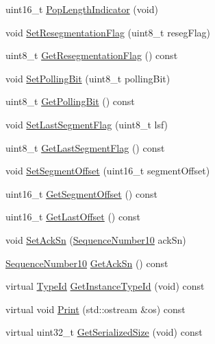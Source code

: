 \begin{DoxyCompactItemize}
\item 
uint16\+\_\+t \hyperlink{classns3_1_1LteRlcAmHeader_aada74283d61785bdae7b6b33bd4a1c63}{Pop\+Length\+Indicator} (void)
\item 
void \hyperlink{classns3_1_1LteRlcAmHeader_ad86717164e73bb1e28c3bafb24bb40de}{Set\+Resegmentation\+Flag} (uint8\+\_\+t reseg\+Flag)
\item 
uint8\+\_\+t \hyperlink{classns3_1_1LteRlcAmHeader_a526f0f33a1bb9f720454d1b7690c34a8}{Get\+Resegmentation\+Flag} () const 
\item 
void \hyperlink{classns3_1_1LteRlcAmHeader_a2e7aef3eebd16fa3c1eb40678c81bbba}{Set\+Polling\+Bit} (uint8\+\_\+t polling\+Bit)
\item 
uint8\+\_\+t \hyperlink{classns3_1_1LteRlcAmHeader_a43f01aa9694807a4c14afe7b19c6c0d2}{Get\+Polling\+Bit} () const 
\item 
void \hyperlink{classns3_1_1LteRlcAmHeader_a408b1d5bb16486ad29899eadd882df82}{Set\+Last\+Segment\+Flag} (uint8\+\_\+t lsf)
\item 
uint8\+\_\+t \hyperlink{classns3_1_1LteRlcAmHeader_a341994e4b1d8c51c3ad362a677b2c248}{Get\+Last\+Segment\+Flag} () const 
\item 
void \hyperlink{classns3_1_1LteRlcAmHeader_a10c064791fc0a45af04e625b2fa31428}{Set\+Segment\+Offset} (uint16\+\_\+t segment\+Offset)
\item 
uint16\+\_\+t \hyperlink{classns3_1_1LteRlcAmHeader_ab299fbc42c7d11a65704a9b4479445f8}{Get\+Segment\+Offset} () const 
\item 
uint16\+\_\+t \hyperlink{classns3_1_1LteRlcAmHeader_a2b01704f06454f1c73f4a47b2728547f}{Get\+Last\+Offset} () const 
\item 
void \hyperlink{classns3_1_1LteRlcAmHeader_ab60bd0b64bf9156b1401d4ebf7113aeb}{Set\+Ack\+Sn} (\hyperlink{classns3_1_1SequenceNumber10}{Sequence\+Number10} ack\+Sn)
\item 
\hyperlink{classns3_1_1SequenceNumber10}{Sequence\+Number10} \hyperlink{classns3_1_1LteRlcAmHeader_a60b8323fd1f7cc4449308342c3080831}{Get\+Ack\+Sn} () const 
\item 
virtual \hyperlink{classns3_1_1TypeId}{Type\+Id} \hyperlink{classns3_1_1LteRlcAmHeader_a10d88ddddc13bda7853b8c823fa46e80}{Get\+Instance\+Type\+Id} (void) const 
\item 
virtual void \hyperlink{classns3_1_1LteRlcAmHeader_a0b91ce3df4f0fcb615804e0d4093d5dd}{Print} (std\+::ostream \&os) const 
\item 
virtual uint32\+\_\+t \hyperlink{classns3_1_1LteRlcAmHeader_a246844a4cd9772f5b926aaa27be229b9}{Get\+Serialized\+Size} (void) const 

\end{DoxyCompactItemize}
